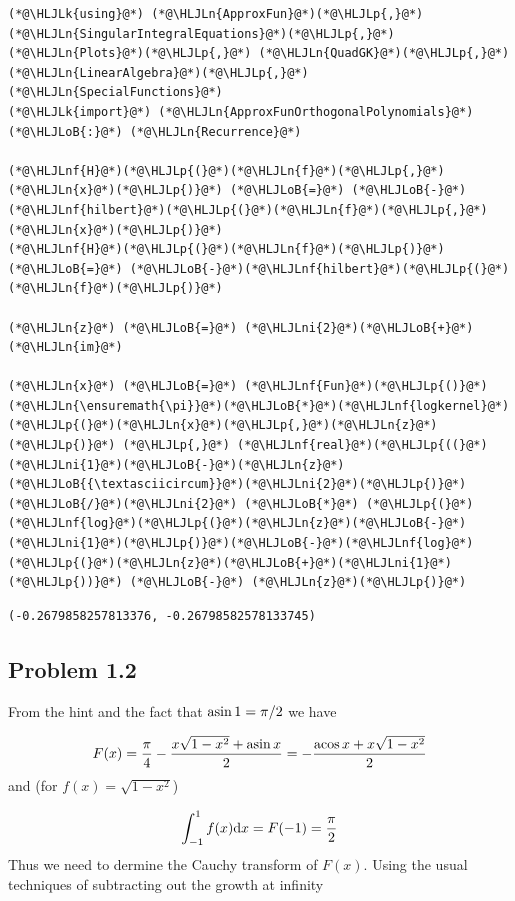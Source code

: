 \documentclass[12pt,a4paper]{article}
\newcommand{\HLJLk}[1]{\textcolor[RGB]{148,91,176}{\textbf{#1}}}
\newcommand{\HLJLn}[1]{#1}
\newcommand{\HLJLnf}[1]{\textcolor[RGB]{66,102,213}{#1}}
\newcommand{\HLJLni}[1]{\textcolor[RGB]{59,151,46}{#1}}
\newcommand{\HLJLoB}[1]{\textcolor[RGB]{102,102,102}{\textbf{#1}}}
\newcommand{\HLJLp}[1]{#1}
\def\D{ {\rm d} }
\def\acos{ {\rm acos}\, }
\def\asin{ {\rm asin}\, }
\begin{document}
\begin{lstlisting}
(*@\HLJLk{using}@*) (*@\HLJLn{ApproxFun}@*)(*@\HLJLp{,}@*) (*@\HLJLn{SingularIntegralEquations}@*)(*@\HLJLp{,}@*) (*@\HLJLn{Plots}@*)(*@\HLJLp{,}@*) (*@\HLJLn{QuadGK}@*)(*@\HLJLp{,}@*) (*@\HLJLn{LinearAlgebra}@*)(*@\HLJLp{,}@*) (*@\HLJLn{SpecialFunctions}@*)
(*@\HLJLk{import}@*) (*@\HLJLn{ApproxFunOrthogonalPolynomials}@*)(*@\HLJLoB{:}@*) (*@\HLJLn{Recurrence}@*)

(*@\HLJLnf{H}@*)(*@\HLJLp{(}@*)(*@\HLJLn{f}@*)(*@\HLJLp{,}@*)(*@\HLJLn{x}@*)(*@\HLJLp{)}@*) (*@\HLJLoB{=}@*) (*@\HLJLoB{-}@*)(*@\HLJLnf{hilbert}@*)(*@\HLJLp{(}@*)(*@\HLJLn{f}@*)(*@\HLJLp{,}@*)(*@\HLJLn{x}@*)(*@\HLJLp{)}@*)
(*@\HLJLnf{H}@*)(*@\HLJLp{(}@*)(*@\HLJLn{f}@*)(*@\HLJLp{)}@*) (*@\HLJLoB{=}@*) (*@\HLJLoB{-}@*)(*@\HLJLnf{hilbert}@*)(*@\HLJLp{(}@*)(*@\HLJLn{f}@*)(*@\HLJLp{)}@*)

(*@\HLJLn{z}@*) (*@\HLJLoB{=}@*) (*@\HLJLni{2}@*)(*@\HLJLoB{+}@*)(*@\HLJLn{im}@*)

(*@\HLJLn{x}@*) (*@\HLJLoB{=}@*) (*@\HLJLnf{Fun}@*)(*@\HLJLp{()}@*)
(*@\HLJLn{\ensuremath{\pi}}@*)(*@\HLJLoB{*}@*)(*@\HLJLnf{logkernel}@*)(*@\HLJLp{(}@*)(*@\HLJLn{x}@*)(*@\HLJLp{,}@*)(*@\HLJLn{z}@*)(*@\HLJLp{)}@*) (*@\HLJLp{,}@*) (*@\HLJLnf{real}@*)(*@\HLJLp{((}@*)(*@\HLJLni{1}@*)(*@\HLJLoB{-}@*)(*@\HLJLn{z}@*)(*@\HLJLoB{{\textasciicircum}}@*)(*@\HLJLni{2}@*)(*@\HLJLp{)}@*)(*@\HLJLoB{/}@*)(*@\HLJLni{2}@*) (*@\HLJLoB{*}@*) (*@\HLJLp{(}@*)(*@\HLJLnf{log}@*)(*@\HLJLp{(}@*)(*@\HLJLn{z}@*)(*@\HLJLoB{-}@*)(*@\HLJLni{1}@*)(*@\HLJLp{)}@*)(*@\HLJLoB{-}@*)(*@\HLJLnf{log}@*)(*@\HLJLp{(}@*)(*@\HLJLn{z}@*)(*@\HLJLoB{+}@*)(*@\HLJLni{1}@*)(*@\HLJLp{))}@*) (*@\HLJLoB{-}@*) (*@\HLJLn{z}@*)(*@\HLJLp{)}@*)
\end{lstlisting}

\begin{lstlisting}
(-0.2679858257813376, -0.26798582578133745)
\end{lstlisting}


\subsection{Problem 1.2}
From the hint and the fact that $\asin 1 = \pi/2$ we have

\[
F(x) = {\pi \over 4}- {x \sqrt{1-x^2} + \asin x \over 2} =
    -{\acos x + x \sqrt{1-x^2} \over 2}
\]
and  (for $f(x) = \sqrt{1-x^2}$)

\[
\int_{-1}^1 f(x) \D x = F(-1) = {\pi \over 2}
\]
Thus we need to dermine the Cauchy transform of $F(x)$.  Using the usual techniques of subtracting out the growth at  infinity
\end{document}
